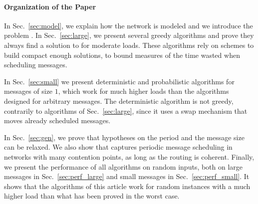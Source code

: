 \documentclass[pdflatex,sn-mathphys,iicol]{sn-jnl}%
\theoremstyle{thmstyleone}%
\theoremstyle{thmstyletwo}%
\theoremstyle{thmstylethree}%
\begin{document}
\paragraph*{Organization of the Paper}

In Sec.~\ref{sec:model}, we explain how the network is modeled and we introduce the problem \pma. In Sec.~\ref{sec:large}, we present several greedy algorithms and prove they always find a solution to \pma for moderate loads. These algorithms rely on schemes to build compact enough solutions, to bound measures of the time wasted when scheduling messages. 

In Sec.~\ref{sec:small} we present deterministic and probabilistic algorithms for messages of size $1$, which work for much higher loads than the algorithms designed for arbitrary messages. The deterministic algorithm is not greedy, contrarily to algorithms of Sec.~\ref{sec:large}, since it uses a swap mechanism that moves already scheduled messages. 

In Sec.~\ref{sec:gen}, we prove that hypotheses on the period and the message size can be relaxed. We also show that \pma captures periodic message scheduling in networks with many contention points, as long as the routing is coherent.
Finally, we present the performance of all algorithms on random inputs, both on large messages in Sec.~\ref{sec:perf_large} and small messages in Sec.~\ref{sec:perf_small}.
It shows that the algorithms of this article work for random instances with a much higher load than what has been proved in the worst case.
\end{document}
